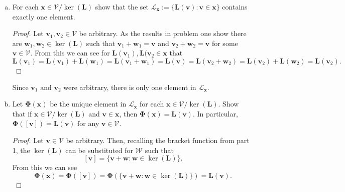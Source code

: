 \documentclass[12pt]{amsart}
\newcommand{\1}{\mathbbm{1}}
\numberwithin{equation}{section}
\numberwithin{Theorem}{section}
\theoremstyle{plain} %
\theoremstyle{definition}
\theoremstyle{remark}
\begin{document}
\begin{enumerate}[1.]
\bigskip

\begin{enumerate}[(a)]

\item For each \(\mathbf{x}\in\mathcal{V}/\operatorname{ker}(\mathbf{L})\) show that the set \(\mathcal{L}_{\mathbf{x}}:=\{\mathbf{L}(\mathbf{v}) : \mathbf{v}\in\mathbf{x}\}\) contains exactly one element.

\bigskip

\begin{proof}
Let \(\mathbf{v}_1,\mathbf{v}_2\in\mathcal{V}\) be arbitrary.
As the results in problem one show there are 
\(\mathbf{w}_1,\mathbf{w}_2\in\ker(\mathbf{L})\) 
such that \(\mathbf{v}_1+\mathbf{w}_1=\mathbf{v}\) 
and \(\mathbf{v}_2+\mathbf{w}_2=\mathbf{v}\) 
for some \(\mathbf{v}\in\mathcal{V}\).
From this we can see for 
\(\mathbf{L}(\mathbf{v}_1),\mathbf{L}(\mathbf{v}_2\in\mathbf{x}\) that
\[
\mathbf{L}(\mathbf{v}_1) 
= \mathbf{L}(\mathbf{v}_1) + \mathbf{L}(\mathbf{w}_1)
= \mathbf{L}(\mathbf{v}_1+\mathbf{w}_1)
= \mathbf{L}(\mathbf{v})
= \mathbf{L}(\mathbf{v}_2+\mathbf{w}_2)
= \mathbf{L}(\mathbf{v}_2) + \mathbf{L}(\mathbf{w}_2)
= \mathbf{L}(\mathbf{v}_2)
.\]
\end{proof}	
Since \(\mathbf{v}_1\text{ and }\mathbf{v}_2\) were arbitrary, there is only one element in $\mathcal{L}_\mathbf{x}$.

\item Let \(\mathbf{\Phi}(\mathbf{x})\) be the unique element in \(\mathcal{L}_{\mathbf{x}}\) for each \(\mathbf{x}\in\mathcal{V}/\operatorname{ker}(\mathbf{L})\). Show that if \(\mathbf{x}\in\mathcal{V}/\operatorname{ker}(\mathbf{L})\) and \(\mathbf{v}\in\mathbf{x}\), then \(\mathbf{\Phi}(\mathbf{x}) = \mathbf{L}(\mathbf{v})\). In particular, \(\mathbf{\Phi}([\mathbf{v}]) = \mathbf{L}(\mathbf{v})\) for any \(\mathbf{v}\in\mathcal{V}\). 

\bigskip

\begin{proof}
Let $\mathbf{v}\in\mathcal{V}$ be arbitrary.
Then, recalling the bracket function from part 1, the 
$\ker(\mathbf{L})$ can be substituted for $\mathcal{W}$ such that
\[
[\mathbf{v}] = \{\mathbf{v}+\mathbf{w}:\mathbf{w}\in\ker(\mathbf{L})\}
.\]
From this we can see
\[
\mathbf{\Phi}(\mathbf{x})
= \mathbf{\Phi}([\mathbf{v}])
= \mathbf{\Phi}(\{\mathbf{v}+\mathbf{w}:\mathbf{w}\in\ker(\mathbf{L})\})
= \mathbf{L}(\mathbf{v})
.\]
\end{proof}


\end{enumerate}
\end{enumerate}
\end{document}
